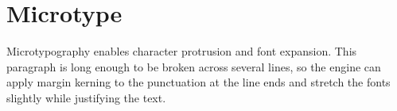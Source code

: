 \documentclass{article}
\begin{document}
\section{Microtype}
Microtypography enables character protrusion and font expansion.
This paragraph is long enough to be broken across several lines, so
the engine can apply margin kerning to the punctuation at the line
ends and stretch the fonts slightly while justifying the text.
\end{document}
